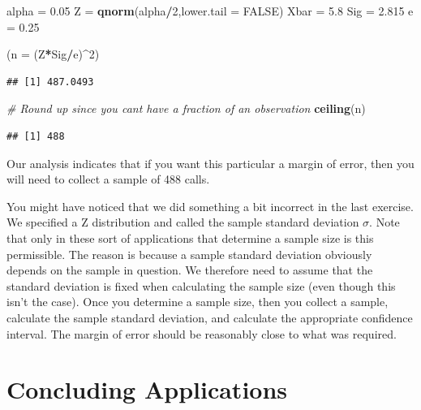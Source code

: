 \documentclass[
]{book}
\newenvironment{Shaded}{\begin{snugshade}}{\end{snugshade}}
\newcommand{\AttributeTok}[1]{\textcolor[rgb]{0.13,0.29,0.53}{#1}}
\newcommand{\CommentTok}[1]{\textcolor[rgb]{0.56,0.35,0.01}{\textit{#1}}}
\newcommand{\ConstantTok}[1]{\textcolor[rgb]{0.56,0.35,0.01}{#1}}
\newcommand{\DecValTok}[1]{\textcolor[rgb]{0.00,0.00,0.81}{#1}}
\newcommand{\FloatTok}[1]{\textcolor[rgb]{0.00,0.00,0.81}{#1}}
\newcommand{\FunctionTok}[1]{\textcolor[rgb]{0.13,0.29,0.53}{\textbf{#1}}}
\newcommand{\NormalTok}[1]{#1}
\newcommand{\OtherTok}[1]{\textcolor[rgb]{0.56,0.35,0.01}{#1}}
\newcommand{\SpecialCharTok}[1]{\textcolor[rgb]{0.81,0.36,0.00}{\textbf{#1}}}
\begin{document}
\begin{Shaded}
\begin{Highlighting}[]
\NormalTok{alpha }\OtherTok{=} \FloatTok{0.05}
\NormalTok{Z }\OtherTok{=} \FunctionTok{qnorm}\NormalTok{(alpha}\SpecialCharTok{/}\DecValTok{2}\NormalTok{,}\AttributeTok{lower.tail =} \ConstantTok{FALSE}\NormalTok{)}
\NormalTok{Xbar }\OtherTok{=} \FloatTok{5.8}
\NormalTok{Sig }\OtherTok{=} \FloatTok{2.815}
\NormalTok{e }\OtherTok{=} \FloatTok{0.25}

\NormalTok{(}\AttributeTok{n =}\NormalTok{ (Z}\SpecialCharTok{*}\NormalTok{Sig}\SpecialCharTok{/}\NormalTok{e)}\SpecialCharTok{\^{}}\DecValTok{2}\NormalTok{)}
\end{Highlighting}
\end{Shaded}

\begin{verbatim}
## [1] 487.0493
\end{verbatim}

\begin{Shaded}
\begin{Highlighting}[]
\CommentTok{\# Round up since you can\textquotesingle{}t have a fraction of an observation}
\FunctionTok{ceiling}\NormalTok{(n)}
\end{Highlighting}
\end{Shaded}

\begin{verbatim}
## [1] 488
\end{verbatim}

Our analysis indicates that if you want this particular a margin of error, then you will need to collect a sample of 488 calls.

You might have noticed that we did something a bit incorrect in the last exercise. We specified a Z distribution and called the sample standard deviation \(\sigma\). Note that only in these sort of applications that determine a sample size is this permissible. The reason is because a sample standard deviation obviously depends on the sample in question. We therefore need to assume that the standard deviation is fixed when calculating the sample size (even though this isn't the case). Once you determine a sample size, then you collect a sample, calculate the sample standard deviation, and calculate the appropriate confidence interval. The margin of error should be reasonably close to what was required.

\section{Concluding Applications}\label{concluding-applications}
\end{document}
